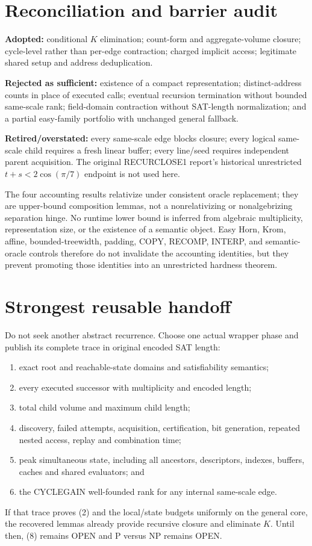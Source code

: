 \documentclass[11pt]{article}
\begin{document}
\section{Reconciliation and barrier audit}
\textbf{Adopted:} conditional $K$ elimination; count-form and aggregate-volume
closure; cycle-level rather than per-edge contraction; charged implicit
access; legitimate shared setup and address deduplication.

\textbf{Rejected as sufficient:} existence of a compact representation;
distinct-address counts in place of executed calls; eventual recursion
termination without bounded same-scale rank; field-domain contraction without
SAT-length normalization; and a partial easy-family portfolio with unchanged
general fallback.

\textbf{Retired/overstated:} every same-scale edge blocks closure; every
logical same-scale child requires a fresh linear buffer; every line/seed
requires independent parent acquisition.  The original RECURCLOSE1 report's
historical unrestricted $t+s<2\cos(\pi/7)$ endpoint is not used here.

The four accounting results relativize under consistent oracle replacement;
they are upper-bound composition lemmas, not a nonrelativizing or
nonalgebrizing separation hinge.  No runtime lower bound is inferred from
algebraic multiplicity, representation size, or the existence of a semantic
object.  Easy Horn, Krom, affine, bounded-treewidth, padding, COPY, RECOMP,
INTERP, and semantic-oracle controls therefore do not invalidate the
accounting identities, but they prevent promoting those identities into an
unrestricted hardness theorem.

\section{Strongest reusable handoff}
Do not seek another abstract recurrence.  Choose one actual wrapper phase and
publish its complete trace in original encoded SAT length:
\begin{enumerate}
\item exact root and reachable-state domains and satisfiability semantics;
\item every executed successor with multiplicity and encoded length;
\item total child volume and maximum child length;
\item discovery, failed attempts, acquisition, certification, bit generation,
repeated nested access, replay and combination time;
\item peak simultaneous state, including all ancestors, descriptors, indexes,
buffers, caches and shared evaluators; and
\item the CYCLEGAIN well-founded rank for any internal same-scale edge.
\end{enumerate}
If that trace proves (2) and the local/state budgets uniformly on the general
core, the recovered lemmas already provide recursive closure and eliminate
$K$.  Until then, (8) remains OPEN and P versus NP remains OPEN.
\end{document}
